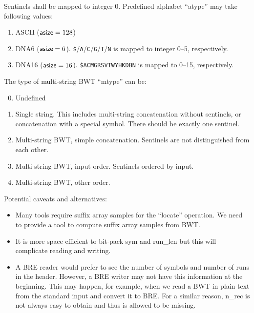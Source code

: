 \documentclass[10pt]{article}
\begin{document}
{\small
Sentinels shall be mapped to integer 0.
Predefined alphabet ``{\sf atype}'' may take following values:
\begin{enumerate}
\item {\sf ASCII} (${\sf asize}=128$)
\item {\sf DNA6} (${\sf asize}=6$). {\tt \$}/{\tt A}/{\tt C}/{\tt G}/{\tt T}/{\tt N} is mapped to integer 0--5, respectively.
\item {\sf DNA16} (${\sf asize}=16$). {\tt \$ACMGRSVTWYHKDBN} is mapped to 0--15, respectively.
\end{enumerate}

The type of multi-string BWT ``{\sf mtype}'' can be:
\begin{enumerate}
\setcounter{enumi}{-1}
\item Undefined
\item Single string. This includes multi-string concatenation without sentinels, or concatenation with a special symbol.
  There should be exactly one sentinel.
\item Multi-string BWT, simple concatenation. Sentinels are not distinguished from each other.
\item Multi-string BWT, input order. Sentinels ordered by input.
\item Multi-string BWT, other order.
\end{enumerate}

Potential caveats and alternatives:
\begin{itemize}
\item Many tools require suffix array samples for the ``locate'' operation.
  We need to provide a tool to compute suffix array samples from BWT.
\item It is more space efficient to bit-pack {\sf sym} and {\sf run\_len} but this will complicate reading and writing.
\item A BRE reader would prefer to see the number of symbols and number of runs in the header.
  However, a BRE writer may not have this information at the beginning.
  This may happen, for example, when we read a BWT in plain text from the standard input and convert it to BRE.
  For a similar reason, {\sf n\_rec} is not always easy to obtain and thus is allowed to be missing.
\end{itemize}
}
\end{document}
